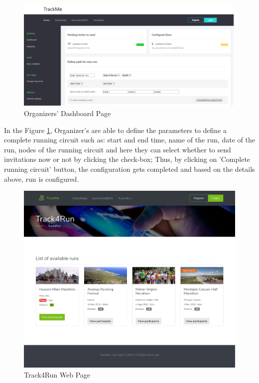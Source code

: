 \documentclass[a4paper, hidelinks, 12pt]{report}
\begin{document}
	\begin{figure}[H]
		\centering
		\includegraphics[width=1\textwidth]{UI/db_organizer2.png}
		\caption[UI: Organizers' Dashboard Page]{Organizers' Dashboard Page}
		\label{fig:organizer_dashboard_2}
	\end{figure}
	In the Figure \ref{fig:organizer_dashboard_2}, Organizer's are able to define the parameters to define a complete running circuit such as: start and end time, name of the run, date of the run, nodes of the running circuit and here they can select whether to send invitations now or not by clicking the check-box; Thus, by clicking on 'Complete running circuit' button, the configuration gets completed and based on the details above, run is configured.
	
	\begin{figure}[H]
		\centering
		\includegraphics[width=1\textwidth]{UI/track4run.png}
		\caption[UI: Track4Run Web Page]{Track4Run Web Page}
		\label{fig:Track4Run Web Page}
	\end{figure}
	
\end{document}

